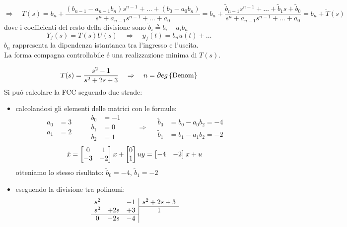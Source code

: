 \documentclass[../main.tex]{subfiles}
\begin{document}
		\newline
		\[
			\Rightarrow\quad T(s) = b_n + \dfrac{(b_{n-1} - a_{n-1} b_n)s^{n-1} + \dots + (b_0 - a_0 b_n)}{s^n + a_{n-1} s^{n-1} + \dots + a_0} = b_n + \dfrac{\tilde b_{n-1} s^{n-1} + \dots + \tilde b_1 s + \tilde b_0}{s^n + a_{n-1} s^{n-1} + \dots + a_0} = b_n + \tilde T(s)
		\]
		dove i coefficienti del resto della divisione sono $ \tilde b_i \triangleq b_i - a_i b_n $
		\[
			Y_f(s) = T(s) U(s) \quad\Rightarrow\quad y_f(t) = b_n u(t) + \ldots
		\]
		$ b_n $ rappresenta la dipendenza istantanea tra l'ingresso e l'uscita.\\
		\newline
		La forma compagna controllabile \'e una realizzazione minima di $ T(s) $.
		
		\begin{Exercise}[title={Calcolare la forma compagna controllabile}, difficulty=1]
			\[
				T(s) = \dfrac{s^2-1}{s^2+2s+3} \quad\Rightarrow\quad n = \partial eg \left\lbrace \text{Denom} \right\rbrace
			\]
			Si pu\'o calcolare la FCC seguendo due strade:
			\begin{itemize}
				\item 
					calcolandosi gli elementi delle matrici con le formule:
					\[
						\begin{aligned}
							a_0 &= 3\\
							a_1 &= 2
						\end{aligned}
						\qquad
						\begin{aligned}
							b_0 &= -1\\
							b_1 &= 0\\
							b_2 &= 1
						\end{aligned}
						\qquad\Rightarrow\quad
						\begin{aligned}
							\tilde b_0 &= b_0 - a_0 b_2 = -4\\
							\tilde b_1 &= b_1 - a_1 b_2 = -2
						\end{aligned}
					\]
					\[
						\dot x = 
						\begin{bmatrix}
							0 & 1\\
							-3 & -2
						\end{bmatrix} x+
						\begin{bmatrix}
							0\\
							1
						\end{bmatrix} u
						\\
						y =
						\begin{bmatrix}
							-4 & -2
						\end{bmatrix} x + u
					\]
					otteniamo lo stesso risultato: $ \tilde b_0 = -4 $, $ \tilde b_1 = -2 $
				\item 
					eseguendo la divisione tra polinomi:
					\[
						\begin{array}{ccc|c}
							s^2 & & -1 & s^2 + 2s + 3
							\\\cline{4-4}
							s^2 & +2s & +3 & 1
							\\\cline{1-3}
							0 & -2s & -4 &
						\end{array}
					\]
			\end{itemize} 
		\end{Exercise}
	
\end{document}
